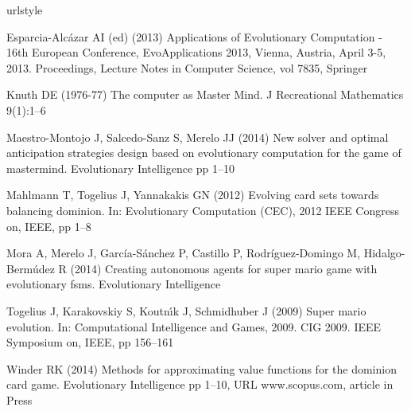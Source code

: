 \documentclass[smallextended]{svjour3}
\begin{document}
\begin{thebibliography}{7}
\providecommand{\natexlab}[1]{#1}
\providecommand{\url}[1]{{#1}}
\providecommand{\urlprefix}{URL }
\expandafter\ifx\csname urlstyle\endcsname\relax
  \providecommand{\doi}[1]{DOI~\discretionary{}{}{}#1}\else
  \providecommand{\doi}{DOI~\discretionary{}{}{}\begingroup
  \urlstyle{rm}\Url}\fi
\providecommand{\eprint}[2][]{\url{#2}}

Esparcia-Alc{\'a}zar AI (ed) (2013) Applications of Evolutionary Computation -
  16th European Conference, EvoApplications 2013, Vienna, Austria, April 3-5,
  2013. Proceedings, Lecture Notes in Computer Science, vol 7835, Springer

Knuth DE (1976-77) The computer as {M}aster {M}ind. J Recreational Mathematics
  9(1):1--6

Maestro-Montojo J, Salcedo-Sanz S, Merelo JJ (2014) New solver and optimal
  anticipation strategies design based on evolutionary computation for the game
  of mastermind. Evolutionary Intelligence pp 1--10

Mahlmann T, Togelius J, Yannakakis GN (2012) Evolving card sets towards
  balancing dominion. In: Evolutionary Computation (CEC), 2012 IEEE Congress
  on, IEEE, pp 1--8

Mora A, Merelo J, Garc\'ia-S\'anchez P, Castillo P, Rodr\'iguez-Domingo M,
  Hidalgo-Berm\'udez R (2014) Creating autonomous agents for super mario game
  with evolutionary fsms. Evolutionary Intelligence

Togelius J, Karakovskiy S, Koutn{\'\i}k J, Schmidhuber J (2009) Super mario
  evolution. In: Computational Intelligence and Games, 2009. CIG 2009. IEEE
  Symposium on, IEEE, pp 156--161

Winder RK (2014) Methods for approximating value functions for the dominion
  card game. Evolutionary Intelligence pp 1--10,
  \urlprefix\url{www.scopus.com}, article in Press

\end{thebibliography}
\end{document}
